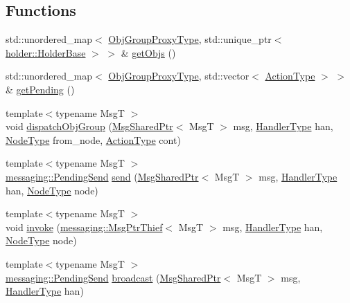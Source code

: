 \subsection*{Functions}
\begin{DoxyCompactItemize}
\item 
std\+::unordered\+\_\+map$<$ \hyperlink{namespacevt_ad7cae989df485fccca57f0792a880a8e}{Obj\+Group\+Proxy\+Type}, std\+::unique\+\_\+ptr$<$ \hyperlink{structvt_1_1objgroup_1_1holder_1_1_holder_base}{holder\+::\+Holder\+Base} $>$ $>$ \& \hyperlink{namespacevt_1_1objgroup_a51307ccb565eb0441ba64949c67031cb}{get\+Objs} ()
\item 
std\+::unordered\+\_\+map$<$ \hyperlink{namespacevt_ad7cae989df485fccca57f0792a880a8e}{Obj\+Group\+Proxy\+Type}, std\+::vector$<$ \hyperlink{namespacevt_ae0a5a7b18cc99d7b732cb4d44f46b0f3}{Action\+Type} $>$ $>$ \& \hyperlink{namespacevt_1_1objgroup_a0574ec1b0319596b2f2af0a107108390}{get\+Pending} ()
\item 
{\footnotesize template$<$typename MsgT $>$ }\\void \hyperlink{namespacevt_1_1objgroup_ad45be555d5ff3bd308e8f61e4e2dd909}{dispatch\+Obj\+Group} (\hyperlink{namespacevt_ab2b3d506ec8e8d1540aede826d84a239}{Msg\+Shared\+Ptr}$<$ MsgT $>$ msg, \hyperlink{namespacevt_af64846b57dfcaf104da3ef6967917573}{Handler\+Type} han, \hyperlink{namespacevt_a866da9d0efc19c0a1ce79e9e492f47e2}{Node\+Type} from\+\_\+node, \hyperlink{namespacevt_ae0a5a7b18cc99d7b732cb4d44f46b0f3}{Action\+Type} cont)
\item 
{\footnotesize template$<$typename MsgT $>$ }\\\hyperlink{structvt_1_1messaging_1_1_pending_send}{messaging\+::\+Pending\+Send} \hyperlink{namespacevt_1_1objgroup_a6efc2df6997b609c551848af332cfb15}{send} (\hyperlink{namespacevt_ab2b3d506ec8e8d1540aede826d84a239}{Msg\+Shared\+Ptr}$<$ MsgT $>$ msg, \hyperlink{namespacevt_af64846b57dfcaf104da3ef6967917573}{Handler\+Type} han, \hyperlink{namespacevt_a866da9d0efc19c0a1ce79e9e492f47e2}{Node\+Type} node)
\item 
{\footnotesize template$<$typename MsgT $>$ }\\void \hyperlink{namespacevt_1_1objgroup_aee19dffbee9f43f1a28d08f1c07996c7}{invoke} (\hyperlink{structvt_1_1messaging_1_1_msg_ptr_thief}{messaging\+::\+Msg\+Ptr\+Thief}$<$ MsgT $>$ msg, \hyperlink{namespacevt_af64846b57dfcaf104da3ef6967917573}{Handler\+Type} han, \hyperlink{namespacevt_a866da9d0efc19c0a1ce79e9e492f47e2}{Node\+Type} node)
\item 
{\footnotesize template$<$typename MsgT $>$ }\\\hyperlink{structvt_1_1messaging_1_1_pending_send}{messaging\+::\+Pending\+Send} \hyperlink{namespacevt_1_1objgroup_a1986e4cf0b0e869e44860cd1d98196e7}{broadcast} (\hyperlink{namespacevt_ab2b3d506ec8e8d1540aede826d84a239}{Msg\+Shared\+Ptr}$<$ MsgT $>$ msg, \hyperlink{namespacevt_af64846b57dfcaf104da3ef6967917573}{Handler\+Type} han)
\end{DoxyCompactItemize}


